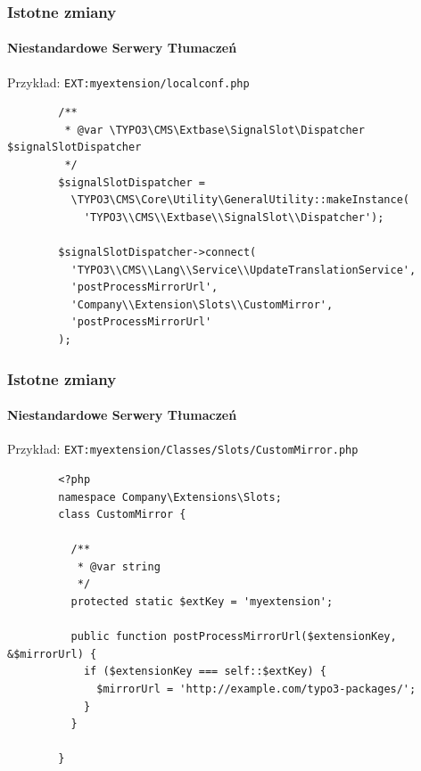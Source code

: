 
\begin{frame}[fragile]
	\frametitle{Istotne zmiany}
	\framesubtitle{Niestandardowe Serwery Tłumaczeń}

	Przykład: \texttt{EXT:myextension/localconf.php}

	\lstset{
		basicstyle=\tiny\ttfamily
	}

	\begin{lstlisting}
		/**
		 * @var \TYPO3\CMS\Extbase\SignalSlot\Dispatcher $signalSlotDispatcher
		 */
		$signalSlotDispatcher =
		  \TYPO3\CMS\Core\Utility\GeneralUtility::makeInstance(
		    'TYPO3\\CMS\\Extbase\\SignalSlot\\Dispatcher');

		$signalSlotDispatcher->connect(
		  'TYPO3\\CMS\\Lang\\Service\\UpdateTranslationService',
		  'postProcessMirrorUrl',
		  'Company\\Extension\Slots\\CustomMirror',
		  'postProcessMirrorUrl'
		);
	\end{lstlisting}

\end{frame}


\begin{frame}[fragile]
	\frametitle{Istotne zmiany}
	\framesubtitle{Niestandardowe Serwery Tłumaczeń}

	Przykład: \texttt{EXT:myextension/Classes/Slots/CustomMirror.php}

	\lstset{
		basicstyle=\tiny\ttfamily
	}

	\begin{lstlisting}
		<?php
		namespace Company\Extensions\Slots;
		class CustomMirror {

		  /**
		   * @var string
		   */
		  protected static $extKey = 'myextension';

		  public function postProcessMirrorUrl($extensionKey, &$mirrorUrl) {
		    if ($extensionKey === self::$extKey) {
		      $mirrorUrl = 'http://example.com/typo3-packages/';
		    }
		  }

		}
	\end{lstlisting}

\end{frame}

